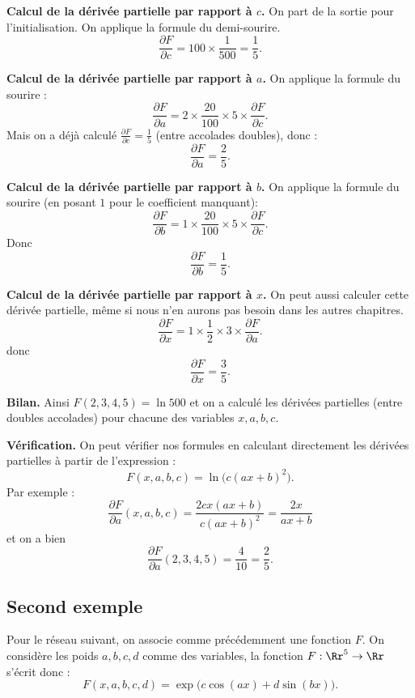 \textbf{Calcul de la dérivée partielle par rapport à $c$.}
On part de la sortie pour l'initialisation. On applique la formule du demi-sourire.
$$\frac{\partial F}{\partial c} = 100 \times \frac{1}{500} = \frac15.$$

\textbf{Calcul de la dérivée partielle par rapport à $a$.}
On applique la formule du sourire :
$$\frac{\partial F}{\partial a} = 2 \times \frac{20}{100} \times 5 \times \frac{\partial F}{\partial c}.$$
Mais on a déjà calculé $\frac{\partial F}{\partial c}=\frac15$ (entre accolades doubles), donc :
$$\frac{\partial F}{\partial a} = \frac25.$$

\textbf{Calcul de la dérivée partielle par rapport à $b$.}
On applique la formule du sourire (en posant $1$ pour le coefficient manquant):
$$\frac{\partial F}{\partial b} = 1 \times \frac{20}{100} \times 5 \times \frac{\partial F}{\partial c}.$$
Donc 
$$\frac{\partial F}{\partial b} = \frac15.$$

\textbf{Calcul de la dérivée partielle par rapport à $x$.}
On peut aussi calculer cette dérivée partielle, même si nous n'en aurons pas besoin dans les autres chapitres. 
$$\frac{\partial F}{\partial x} = 1 \times \frac{1}{2} \times 3 \times \frac{\partial F}{\partial a}.$$
donc 
$$\frac{\partial F}{\partial x} = \frac{3}{5}.$$

\textbf{Bilan.}
Ainsi $F(2,3,4,5)=\ln 500$ et on a calculé les dérivées partielles (entre doubles accolades) pour chacune des variables $x,a,b,c$.

\textbf{Vérification.}
On peut vérifier nos formules en calculant directement les dérivées partielles à partir de l'expression :
$$F(x,a,b,c) = \ln\big( c (ax+b)^2 \big).$$
Par exemple :
$$\frac{\partial F}{\partial a}(x,a,b,c) = \frac{2cx(ax+b)}{c(ax+b)^2} = \frac{2x}{ax+b}$$
et on a bien 
$$\frac{\partial F}{\partial a}(2,3,4,5) = \frac{4}{10} = \frac25.$$

\subsection{Second exemple}

Pour le réseau suivant, on associe comme précédemment une fonction $F$. 
On considère les poids $a,b,c,d$ comme des variables, la fonction $F : \Rr^5 \to \Rr$ s'écrit donc :
$$F(x,a,b,c,d) = \exp\big(c \cos(ax) + d\sin(bx)\big).$$

